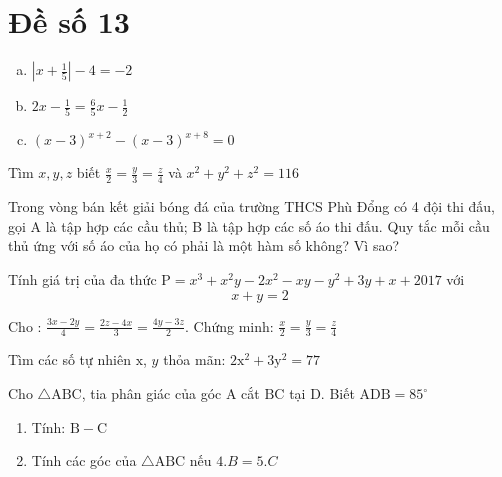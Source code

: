 \onehalfspacing
\section{Đề số 13}
\graphicspath{{./img/}}
\begin{bt} 
    \hfill
	\begin{enumerate}[a.]
		\item $\left|x+\frac{1}{5}\right|-4=-2$
        \item $2 x-\frac{1}{5}=\frac{6}{5} x-\frac{1}{2}$
        \item $(x-3)^{x+2}-(x-3)^{x+8}=0$
	\end{enumerate}
	\loigiai{} 
\end{bt}

\begin{bt}
	Tìm $x, y, z$ biết $\frac{x}{2}=\frac{y}{3}=\frac{z}{4}$ và $x^2+y^2+z^2=116$
	\loigiai{} 
\end{bt}

\begin{bt}
	Trong vòng bán kết giải bóng đá của trường THCS Phù Đổng có 4 đội thi đấu, gọi $\mathrm{A}$ là tập hợp các cầu thủ; B là tập hợp các số áo thi đấu. Quy tắc mỗi cầu thủ ứng với số áo của họ có phải là một hàm số không? Vì sao?
	\loigiai{}
\end{bt}

\begin{bt}
    Tính giá trị của đa thức $\mathrm{P}=x^3+x^2 y-2 x^2-x y-y^2+3 y+x+2017$ với
    $$
    x+y=2
    $$
\loigiai{}
\end{bt}

\begin{bt}
    Cho : $\frac{3 x-2 y}{4}=\frac{2 z-4 x}{3}=\frac{4 y-3 z}{2}$. Chứng minh: $\frac{x}{2}=\frac{y}{3}=\frac{z}{4}$
\loigiai{}
\end{bt}

\begin{bt}
    Tìm các số tự nhiên $\mathrm{x}$, $y$ thỏa mãn: $2 \mathrm{x}^2+3 \mathrm{y}^2=77$  
\loigiai{}
\end{bt}

\begin{bt}
    Cho $\triangle \mathrm{ABC}$, tia phân giác của góc $\mathrm{A}$ cắt $\mathrm{BC}$ tại $\mathrm{D}$. Biết $\mathrm{ADB}=85^{\circ}$
    \begin{enumerate}
        \item Tính: $\mathrm{B}-\mathrm{C}$
        \item Tính các góc của $\triangle \mathrm{ABC}$ nếu $4 . B=5 . C$
    \end{enumerate}
\loigiai{}
\end{bt}

